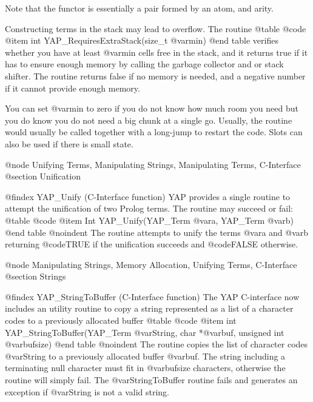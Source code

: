 Note that the functor is essentially a pair formed by an atom, and
arity.

Constructing terms in the stack may lead to overflow. The routine
@table @code
 @item     int          YAP_RequiresExtraStack(size_t @var{min})
@end table
verifies whether you have at least @var{min} cells free in the stack,
and it returns true if it has to ensure enough memory by calling the
garbage collector and or stack shifter. The routine returns false if no
memory is needed, and a negative number if it cannot provide enough
memory.

You can set @var{min} to zero if you do not know how much room you need
but you do know you do not need a big chunk at a single go. Usually, the routine
would usually be called together with a long-jump to restart the
code. Slots can also be used if there is small state.

@node Unifying Terms, Manipulating Strings, Manipulating Terms, C-Interface
@section Unification

@findex YAP_Unify (C-Interface function)
YAP provides a single routine to attempt the unification of two Prolog
terms. The routine may succeed or fail:
@table @code
 @item     Int      YAP_Unify(YAP_Term @var{a}, YAP_Term @var{b})
@end table
@noindent
The routine attempts to unify the terms @var{a} and
@var{b} returning @code{TRUE} if the unification succeeds and @code{FALSE}
otherwise.

@node Manipulating Strings, Memory Allocation, Unifying Terms, C-Interface
@section Strings

@findex YAP_StringToBuffer (C-Interface function)
The YAP C-interface now includes an utility routine to copy a string
represented as a list of a character codes to a previously allocated buffer
@table @code
 @item     int YAP_StringToBuffer(YAP_Term @var{String}, char *@var{buf}, unsigned int @var{bufsize})
@end table
@noindent
The routine copies the list of character codes @var{String} to a
previously allocated buffer @var{buf}. The string including a
terminating null character must fit in @var{bufsize} characters,
otherwise the routine will simply fail. The @var{StringToBuffer} routine
fails and generates an exception if @var{String} is not a valid string.

